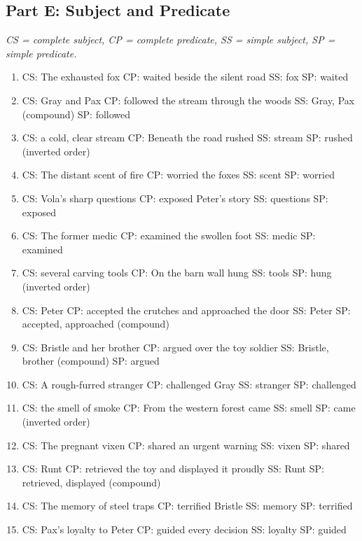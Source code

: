 \documentclass[11pt]{article}
\begin{document}
\subsection*{Part E: Subject and Predicate}
\textit{CS = complete subject, CP = complete predicate, SS = simple subject, SP = simple predicate.}
\begin{enumerate}
  \item CS: The exhausted fox \quad CP: waited beside the silent road \quad SS: fox \quad SP: waited
  \item CS: Gray and Pax \quad CP: followed the stream through the woods \quad SS: Gray, Pax (compound) \quad SP: followed
  \item CS: a cold, clear stream \quad CP: Beneath the road rushed \quad SS: stream \quad SP: rushed \quad (inverted order)
  \item CS: The distant scent of fire \quad CP: worried the foxes \quad SS: scent \quad SP: worried
  \item CS: Vola's sharp questions \quad CP: exposed Peter's story \quad SS: questions \quad SP: exposed
  \item CS: The former medic \quad CP: examined the swollen foot \quad SS: medic \quad SP: examined
  \item CS: several carving tools \quad CP: On the barn wall hung \quad SS: tools \quad SP: hung \quad (inverted order)
  \item CS: Peter \quad CP: accepted the crutches and approached the door \quad SS: Peter \quad SP: accepted, approached (compound)
  \item CS: Bristle and her brother \quad CP: argued over the toy soldier \quad SS: Bristle, brother (compound) \quad SP: argued
  \item CS: A rough-furred stranger \quad CP: challenged Gray \quad SS: stranger \quad SP: challenged
  \item CS: the smell of smoke \quad CP: From the western forest came \quad SS: smell \quad SP: came \quad (inverted order)
  \item CS: The pregnant vixen \quad CP: shared an urgent warning \quad SS: vixen \quad SP: shared
  \item CS: Runt \quad CP: retrieved the toy and displayed it proudly \quad SS: Runt \quad SP: retrieved, displayed (compound)
  \item CS: The memory of steel traps \quad CP: terrified Bristle \quad SS: memory \quad SP: terrified
  \item CS: Pax's loyalty to Peter \quad CP: guided every decision \quad SS: loyalty \quad SP: guided
\end{enumerate}
\end{document}
